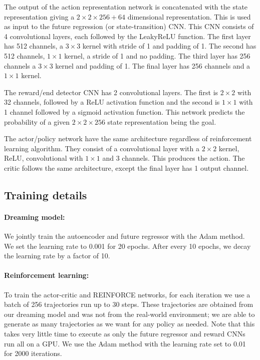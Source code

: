 \documentclass[letterpaper, 10 pt, conference]{ieeeconf}
\begin{document}
The output of the action representation network is concatenated with the state representation giving a $2\times 2\times 256+64$ dimensional representation. This is used as input to the future regression (or state-transition) CNN. This CNN consists of 4 convolutional layers, each followed by the LeakyReLU function.  The first layer has 512 channels, a $3\times 3$  kernel with stride of 1 and padding of 1. The second has 512 channels,  $1\times 1$ kernel, a stride of 1 and no padding. The third layer has 256 channels a $3\times 3$ kernel and padding of 1. The final layer has 256 channels and a $1\times 1$ kernel.

The reward/end detector CNN has 2 convolutional layers. The first is $2\times 2$ with 32 channels, followed by a ReLU activation function and the second is $1\times 1$ with 1 channel followed by a sigmoid activation function. This network predicts the probability of a given $2\times 2\times 256$ state representation being the goal.

The actor/policy network have the same architecture regardless of reinforcement learning algorithm. They consist of a convolutional layer with a $2\times 2$ kernel, ReLU, convolutional with $1\times 1$ and 3 channels. This produces the action. The critic follows the same architecture, except the final layer has 1 output channel.

\subsection{Training details}\paragraph{Dreaming model:}
We jointly train the autoencoder and future regressor with the Adam method. We set the learning rate to 0.001 for 20 epochs. After every 10 epochs, we decay the learning rate by a factor of 10. 

\paragraph{Reinforcement learning:}
To train the actor-critic and REINFORCE networks, for each iteration we use a batch of 256 trajectories run up to 30 steps. These trajectories are obtained from our dreaming model and was not from the real-world environment; we are able to generate as many trajectories as we want for any policy as needed. Note that this takes very little time to execute as only the future regressor and reward CNNs run all on a GPU. We use the Adam method with the learning rate set to 0.01 for 2000 iterations.
\end{document}
